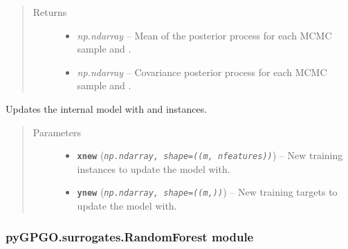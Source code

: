 \documentclass[letterpaper,10pt,english]{sphinxmanual}
\begin{document}
\begin{fulllineitems}
\begin{fulllineitems}
\begin{quote}
\begin{description}
\begin{itemize}
\end{itemize}

\item[{Returns}] \leavevmode
\begin{itemize}
\item {} 
\emph{np.ndarray} -- Mean of the posterior process for each MCMC sample and .

\item {} 
\emph{np.ndarray} -- Covariance posterior process for each MCMC sample and .

\end{itemize}


\end{description}\end{quote}

\end{fulllineitems}


\begin{fulllineitems}
\label{pyGPGO.surrogates.GaussianProcessMCMC:pyGPGO.surrogates.GaussianProcessMCMC.GaussianProcessMCMC.update}
Updates the internal model with  and  instances.
\begin{quote}\begin{description}
\item[{Parameters}] \leavevmode\begin{itemize}
\item {} 
\textbf{\texttt{xnew}} (\emph{\texttt{np.ndarray, shape=((m, nfeatures))}}) -- New training instances to update the model with.

\item {} 
\textbf{\texttt{ynew}} (\emph{\texttt{np.ndarray, shape=((m,))}}) -- New training targets to update the model with.

\end{itemize}

\end{description}\end{quote}

\end{fulllineitems}


\end{fulllineitems}



\subsubsection{pyGPGO.surrogates.RandomForest module}
\label{pyGPGO.surrogates.RandomForest:module-pyGPGO.surrogates.RandomForest}\label{pyGPGO.surrogates.RandomForest::doc}\label{pyGPGO.surrogates.RandomForest:pygpgo-surrogates-randomforest-module}
\end{document}
